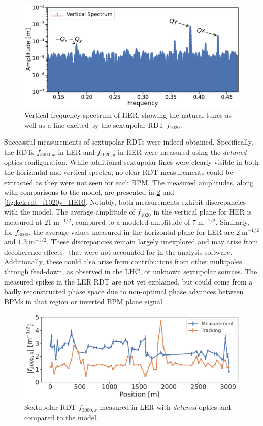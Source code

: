 \begin{figure}[!htb]
    \centering
    \includegraphics[width=0.8\linewidth]{images/kek/HER_2024-02-06_sextupoles_spectrum.pdf}
    \caption{Vertical frequency spectrum of HER, showing the natural tunes as well as a line
    excited by the sextupolar RDT $f_{1020}$.}
    \label{fig:kek:rdt_spectrum_HER}
\end{figure}

Successful measurements of sextupolar RDTs were indeed obtained. Specifically, the RDTs $f_{3000,x}$
in LER and $f_{1020,y}$ in HER were measured using the \textit{detuned} optics configuration. While
additional sextupolar lines were clearly visible in both the horizontal and vertical spectra, no
clear RDT measurements could be extracted as they were not seen for each BPM. The measured
amplitudes, along with comparisons to the model, are presented in \cref{fig:kek:rdt_f3000x_LER} and
\cref{fig:kek:rdt_f1020y_HER}. Notably, both measurements exhibit discrepancies with the model.  The
average amplitude of $f_{1020}$ in the vertical plane for HER is measured at $21\;\text{m}^{-1/2}$, 
compared to a modeled amplitude of $7\;\text{m}^{-1/2}$. Similarly, for $f_{3000}$, the average
values measured in the horizontal plane for LER are $2\;\text{m}^{-1/2}$ and $1.3\;\text{m}^{-1/2}$.
These discrepancies remain largely unexplored and may arise from decoherence
effects~\cite{tomas_direct_2003} that were not accounted for in the analysis software. 
Additionally, these could also arise from contributions from other multipoles through feed-down, as
observed in the LHC, or unknown sextupolar sources. The measured spikes in the LER RDT are not yet 
explained, but could come from a badly reconstructed phase space due to non-optimal phase advances 
between BPMs in that region or inverted BPM plane signal~\cite{frank2024private}.

\begin{figure}[!htb]
    \centering
    \includegraphics[width=0.8\linewidth]{images/kek/f3000x_LER.pdf}
    \caption{Sextupolar RDT $f_{3000,x}$ measured in LER with \textit{detuned} optics and compared
    to the model.}
    \label{fig:kek:rdt_f3000x_LER}
\end{figure}

